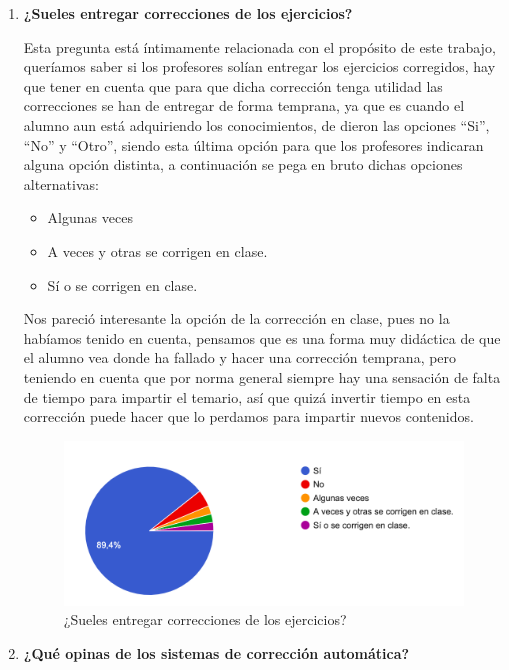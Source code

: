 \begin{enumerate}
\item \textbf{¿Sueles entregar correcciones de los ejercicios?}

Esta pregunta está íntimamente relacionada con el propósito de este trabajo, queríamos saber si los profesores solían entregar los ejercicios corregidos, hay que tener en cuenta que para que dicha corrección tenga utilidad las correcciones se han de entregar de forma temprana, ya que es cuando el alumno aun está adquiriendo los conocimientos, de dieron las opciones ``Si'', ``No'' y ``Otro'', siendo esta última opción para que los profesores indicaran alguna opción distinta, a continuación se pega en bruto dichas opciones alternativas:

\begin{itemize}
    \item Algunas veces
    \item A veces y otras se corrigen en clase.
    \item Sí o se corrigen en clase.
\end{itemize}

Nos pareció interesante la opción de la corrección en clase, pues no la habíamos tenido en cuenta, pensamos que es una forma muy didáctica de que el alumno vea donde ha fallado y hacer una corrección temprana, pero teniendo en cuenta que por norma general siempre hay una sensación de falta de tiempo para impartir el temario, así que quizá invertir tiempo en esta corrección puede hacer que lo perdamos para impartir nuevos contenidos.

\begin{figure}[H]
\centering
\includegraphics[width=1.0\textwidth]{../images/quiz_5}
\caption{¿Sueles entregar correcciones de los ejercicios?}
\label{fig:quiz_5}
\end{figure}

\item \textbf{¿Qué opinas de los sistemas de corrección automática?}


\end{enumerate}
